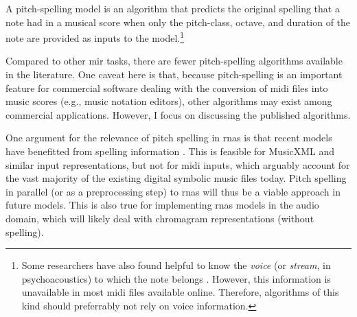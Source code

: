 

A pitch-spelling model is an algorithm that predicts the
original spelling that a note had in a musical score when
only the pitch-class, octave, and duration of the note are
provided as inputs to the model.\footnote{Some researchers
have also found helpful to know the \emph{voice} (or
\emph{stream}, in psychoacoustics) to which the note belongs
\parencite{teodoru2007pitch}. However, this information is
unavailable in most \gls{midi} files available online.
Therefore, algorithms of this kind should preferrably not
rely on voice information.}


Compared to other \gls{mir} tasks, there are fewer
pitch-spelling algorithms available in the literature. One
caveat here is that, because pitch-spelling is an important
feature for commercial software dealing with the conversion
of \gls{midi} files into music scores (e.g., music notation
editors), other algorithms may exist among commercial
applications. However, I focus on discussing the published
algorithms.

One argument for the relevance of pitch spelling in
\glspl{rna} is that recent models have benefitted from
spelling information \parencite{micchi2020not}. This is
feasible for MusicXML and similar input representations, but
not for \gls{midi} inputs, which arguably account for the
vast majority of the existing digital symbolic music files
today. Pitch spelling in parallel (or as a preprocessing
step) to \glspl{rna} will thus be a viable approach in
future models. This is also true for implementing
\glspl{rna} models in the audio domain, which will likely deal with chromagram representations (without spelling).
